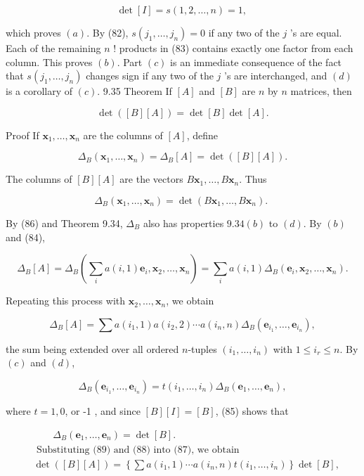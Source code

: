 \documentclass[10pt]{article}
\begin{document}
$$
\operatorname{det}[I]=s(1,2, \ldots, n)=1 \text {, }
$$

which proves $(a)$. By (82), $s\left(j_{1}, \ldots, j_{n}\right)=0$ if any two of the $j$ 's are equal. Each of the remaining $n$ ! products in (83) contains exactly one factor from each column. This proves $(b)$. Part $(c)$ is an immediate consequence of the fact that $s\left(j_{1}, \ldots, j_{n}\right)$ changes sign if any two of the $j$ 's are interchanged, and $(d)$ is a corollary of $(c)$. 9.35 Theorem If $[A]$ and $[B]$ are $n$ by $n$ matrices, then

$$
\operatorname{det}([B][A])=\operatorname{det}[B] \operatorname{det}[A] .
$$

Proof If $\mathbf{x}_{1}, \ldots, \mathbf{x}_{n}$ are the columns of $[A]$, define

$$
\Delta_{B}\left(\mathbf{x}_{1}, \ldots, \mathbf{x}_{n}\right)=\Delta_{B}[A]=\operatorname{det}([B][A]) .
$$

The columns of $[B][A]$ are the vectors $B \mathbf{x}_{1}, \ldots, B \mathbf{x}_{n}$. Thus

$$
\Delta_{B}\left(\mathbf{x}_{1}, \ldots, \mathbf{x}_{n}\right)=\operatorname{det}\left(B \mathbf{x}_{1}, \ldots, B \mathbf{x}_{n}\right) \text {. }
$$

By (86) and Theorem 9.34, $\Delta_{B}$ also has properties $9.34(b)$ to $(d)$. By $(b)$ and (84),

$$
\Delta_{B}[A]=\Delta_{B}\left(\sum_{i} a(i, 1) \mathbf{e}_{i}, \mathbf{x}_{2}, \ldots, \mathbf{x}_{n}\right)=\sum_{i} a(i, 1) \Delta_{B}\left(\mathbf{e}_{i}, \mathbf{x}_{2}, \ldots, \mathbf{x}_{n}\right) .
$$

Repeating this process with $\mathbf{x}_{2}, \ldots, \mathbf{x}_{n}$, we obtain

$$
\Delta_{B}[A]=\sum a\left(i_{1}, 1\right) a\left(i_{2}, 2\right) \cdots a\left(i_{n}, n\right) \Delta_{B}\left(\mathbf{e}_{i_{1}}, \ldots, \mathbf{e}_{i_{n}}\right),
$$

the sum being extended over all ordered $n$-tuples $\left(i_{1}, \ldots, i_{n}\right)$ with $1 \leq i_{r} \leq n$. By $(c)$ and $(d)$,

$$
\Delta_{B}\left(\mathbf{e}_{i_{1}}, \ldots, \mathbf{e}_{i_{n}}\right)=t\left(i_{1}, \ldots, i_{n}\right) \Delta_{B}\left(\mathbf{e}_{1}, \ldots, \mathbf{e}_{n}\right),
$$

where $t=1,0$, or -1 , and since $[B][I]=[B]$, (85) shows that

$$
\begin{aligned}
& \qquad \Delta_{B}\left(\mathbf{e}_{1}, \ldots, \mathbf{e}_{n}\right)=\operatorname{det}[B] . \\
& \text { Substituting (89) and (88) into (87), we obtain } \\
& \operatorname{det}([B][A])=\left\{\sum a\left(i_{1}, 1\right) \cdots a\left(i_{n}, n\right) t\left(i_{1}, \ldots, i_{n}\right)\right\} \operatorname{det}[B],
\end{aligned}
$$
\end{document}
